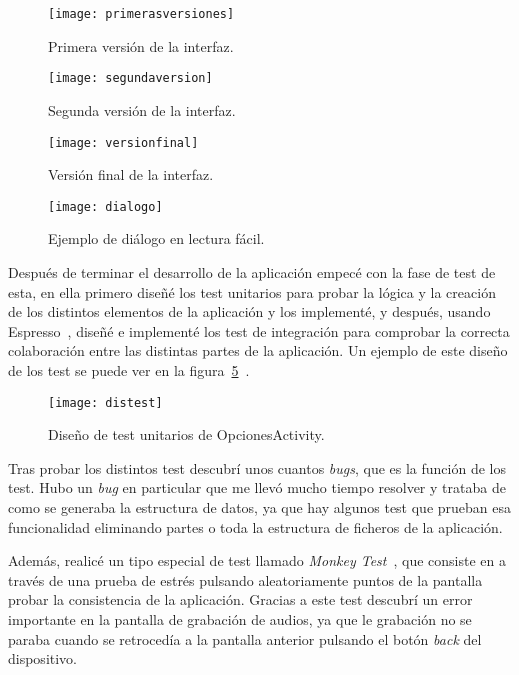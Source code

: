 \begin{figure}
	\centering
	\texttt{[image: primerasversiones]}
	\caption{Primera versión de la interfaz.}
	\label{fig:primver}
\end{figure}
\begin{figure}
	\centering
	\texttt{[image: segundaversion]}
	\caption{Segunda versión de la interfaz.}
	\label{fig:segver}
\end{figure}
\begin{figure}
	\centering
	\texttt{[image: versionfinal]}
	\caption{Versión final de la interfaz.}
	\label{fig:verfi}
\end{figure}
\begin{figure}
	\centering
	\texttt{[image: dialogo]}
	\caption{Ejemplo de diálogo en lectura fácil.}
	\label{fig:dia}
\end{figure}

Después de terminar el desarrollo de la aplicación empecé con la fase de test de esta, en ella primero diseñé los test unitarios para probar la lógica y la creación de los distintos elementos de la aplicación y los implementé, y después, usando Espresso~\cite{espresso}, diseñé e implementé los test de integración para comprobar la correcta colaboración entre las distintas partes de la aplicación. Un ejemplo de este diseño de los test se puede ver en la figura~\ref{fig:ditestun}~\cite{vypcn,vypcb,vypti}.

\begin{figure}
	\centering
	\texttt{[image: distest]}
	\caption{Diseño de test unitarios de OpcionesActivity.}
	\label{fig:ditestun}
\end{figure}

Tras probar los distintos test descubrí unos cuantos \textit{bugs}, que es la función de los test. Hubo un \textit{bug} en particular que me llevó mucho tiempo resolver y trataba de como se generaba la estructura de datos, ya que hay algunos test que prueban esa funcionalidad eliminando partes o toda la estructura de ficheros de la aplicación.

Además, realicé un tipo especial de test llamado \textit{Monkey Test}~\cite{monkeytest}, que consiste en a través de una prueba de estrés pulsando aleatoriamente puntos de la pantalla probar la consistencia de la aplicación. Gracias a este test descubrí un error importante en la pantalla de grabación de audios, ya que le grabación no se paraba cuando se retrocedía a la pantalla anterior pulsando el botón \textit{back} del dispositivo.
